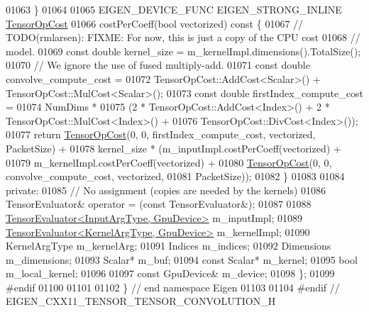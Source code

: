 \begin{DoxyCode}
01063   \}
01064 
01065   EIGEN\_DEVICE\_FUNC EIGEN\_STRONG\_INLINE \hyperlink{class_eigen_1_1_tensor_op_cost}{TensorOpCost}
01066   costPerCoeff(\textcolor{keywordtype}{bool} vectorized)\textcolor{keyword}{ const }\{
01067     \textcolor{comment}{// TODO(rmlarsen): FIXME: For now, this is just a copy of the CPU cost}
01068     \textcolor{comment}{// model.}
01069     \textcolor{keyword}{const} \textcolor{keywordtype}{double} kernel\_size = m\_kernelImpl.dimensions().TotalSize();
01070     \textcolor{comment}{// We ignore the use of fused multiply-add.}
01071     \textcolor{keyword}{const} \textcolor{keywordtype}{double} convolve\_compute\_cost =
01072         TensorOpCost::AddCost<Scalar>() + TensorOpCost::MulCost<Scalar>();
01073     \textcolor{keyword}{const} \textcolor{keywordtype}{double} firstIndex\_compute\_cost =
01074         NumDims *
01075         (2 * TensorOpCost::AddCost<Index>() + 2 * TensorOpCost::MulCost<Index>() +
01076          TensorOpCost::DivCost<Index>());
01077     \textcolor{keywordflow}{return} \hyperlink{class_eigen_1_1_tensor_op_cost}{TensorOpCost}(0, 0, firstIndex\_compute\_cost, vectorized, PacketSize) +
01078            kernel\_size * (m\_inputImpl.costPerCoeff(vectorized) +
01079                           m\_kernelImpl.costPerCoeff(vectorized) +
01080                           \hyperlink{class_eigen_1_1_tensor_op_cost}{TensorOpCost}(0, 0, convolve\_compute\_cost, vectorized,
01081                                        PacketSize));
01082   \}
01083 
01084  \textcolor{keyword}{private}:
01085   \textcolor{comment}{// No assignment (copies are needed by the kernels)}
01086   TensorEvaluator& operator = (\textcolor{keyword}{const} TensorEvaluator&);
01087 
01088   \hyperlink{struct_eigen_1_1_tensor_evaluator}{TensorEvaluator<InputArgType, GpuDevice>} m\_inputImpl;
01089   \hyperlink{struct_eigen_1_1_tensor_evaluator}{TensorEvaluator<KernelArgType, GpuDevice>} m\_kernelImpl;
01090   KernelArgType m\_kernelArg;
01091   Indices m\_indices;
01092   Dimensions m\_dimensions;
01093   Scalar* m\_buf;
01094   \textcolor{keyword}{const} Scalar* m\_kernel;
01095   \textcolor{keywordtype}{bool} m\_local\_kernel;
01096 
01097   \textcolor{keyword}{const} GpuDevice& m\_device;
01098 \};
01099 \textcolor{preprocessor}{#endif}
01100 
01101 
01102 \} \textcolor{comment}{// end namespace Eigen}
01103 
01104 \textcolor{preprocessor}{#endif // EIGEN\_CXX11\_TENSOR\_TENSOR\_CONVOLUTION\_H}
\end{DoxyCode}
